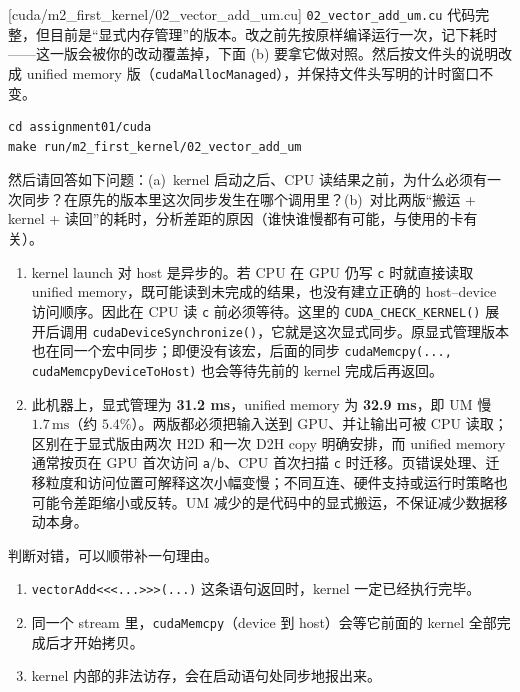 \documentclass[11pt,a4paper,fontset=none]{ctexart}
\begin{document}
[cuda/m2\_first\_kernel/02\_vector\_add\_um.cu]
\texttt{02\_vector\_add\_um.cu} 代码完整，但目前是“显式内存管理”的版本。改之前先按原样编译运行一次，记下耗时——这一版会被你的改动覆盖掉，下面 (b) 要拿它做对照。然后按文件头的说明改成 unified memory 版（\texttt{cudaMallocManaged}），并保持文件头写明的计时窗口不变。

\begin{lstlisting}
cd assignment01/cuda
make run/m2_first_kernel/02_vector_add_um
\end{lstlisting}

然后请回答如下问题：(a)~kernel 启动之后、CPU 读结果之前，为什么必须有一次同步？在原先的版本里这次同步发生在哪个调用里？(b)~对比两版“搬运 + kernel + 读回”的耗时，分析差距的原因（谁快谁慢都有可能，与使用的卡有关）。

\begin{answer}
\begin{enumerate}[label=(\alph*)]
  \item kernel launch 对 host 是异步的。若 CPU 在 GPU 仍写 \texttt{c} 时就直接读取 unified memory，既可能读到未完成的结果，也没有建立正确的 host--device 访问顺序。因此在 CPU 读 \texttt{c} 前必须等待。这里的 \texttt{CUDA\_CHECK\_KERNEL()} 展开后调用 \texttt{cudaDeviceSynchronize()}，它就是这次显式同步。原显式管理版本也在同一个宏中同步；即便没有该宏，后面的同步 \texttt{cudaMemcpy(..., cudaMemcpyDeviceToHost)} 也会等待先前的 kernel 完成后再返回。
  \item 此机器上，显式管理为 \textbf{31.2 ms}，unified memory 为 \textbf{32.9 ms}，即 UM 慢 $1.7\,\mathrm{ms}$（约 $5.4\%$）。两版都必须把输入送到 GPU、并让输出可被 CPU 读取；区别在于显式版由两次 H2D 和一次 D2H copy 明确安排，而 unified memory 通常按页在 GPU 首次访问 \texttt{a}/\texttt{b}、CPU 首次扫描 \texttt{c} 时迁移。页错误处理、迁移粒度和访问位置可解释这次小幅变慢；不同互连、硬件支持或运行时策略也可能令差距缩小或反转。UM 减少的是代码中的显式搬运，不保证减少数据移动本身。
\end{enumerate}
\end{answer}

判断对错，可以顺带补一句理由。
\begin{enumerate}[label=(\alph*)]
  \item \texttt{vectorAdd<<<...>>>(...)} 这条语句返回时，kernel 一定已经执行完毕。
  \item 同一个 stream 里，\texttt{cudaMemcpy}（device 到 host）会等它前面的 kernel 全部完成后才开始拷贝。
  \item kernel 内部的非法访存，会在启动语句处同步地报出来。
\end{enumerate}
\end{document}
